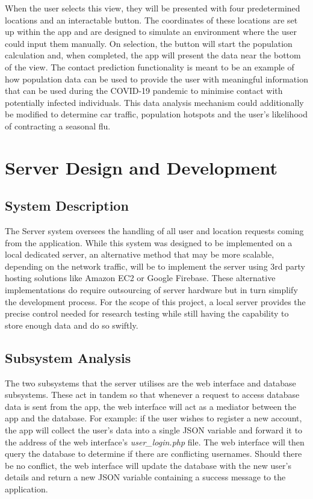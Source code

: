 When the user selects this view, they will be presented with four predetermined locations and an interactable button. The coordinates of these locations are set up within the app and are designed to simulate an environment where the user could input them manually. On selection, the button will start the population calculation and, when completed, the app will present the data near the bottom of the view. The contact prediction functionality is meant to be an example of how population data can be used to provide the user with meaningful information that can be used during the COVID-19 pandemic to minimise contact with potentially infected individuals. This data analysis mechanism could additionally be modified to determine car traffic, population hotspots and the user’s likelihood of contracting a seasonal flu.

\section{Server Design and Development}

\subsection{System Description}
The Server system oversees the handling of all user and location requests coming from the application. While this system was designed to be implemented on a local dedicated server, an alternative method that may be more scalable, depending on the network traffic, will be to implement the server using 3rd party hosting solutions like Amazon EC2 or Google Firebase. These alternative implementations do require outsourcing of server hardware but in turn simplify the development process. For the scope of this project, a local server provides the precise control needed for research testing while still having the capability to store enough data and do so swiftly. 

\subsection{Subsystem Analysis}
The two subsystems that the server utilises are the web interface and database subsystems. These act in tandem so that whenever a request to access database data is sent from the app, the web interface will act as a mediator between the app and the database. For example: if the user wishes to register a new account, the app will collect the user’s data into a single JSON variable and forward it to the address of the web interface’s \textit{user\_login.php} file. The web interface will then query the database to determine if there are conflicting usernames. Should there be no conflict, the web interface will update the database with the new user’s details and return a new JSON variable containing a success message to the application.

